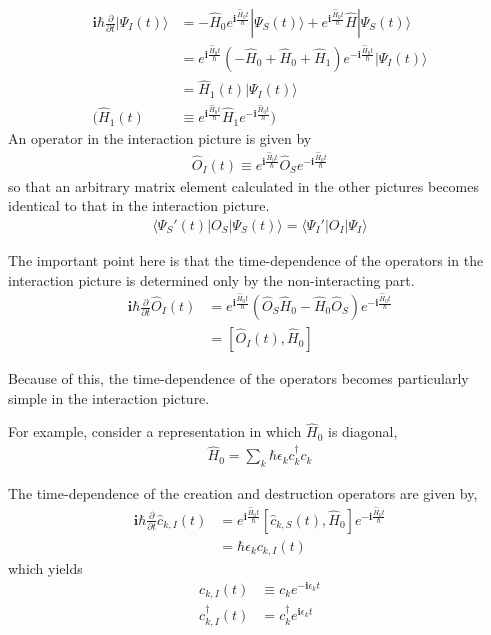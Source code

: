\begin{align}
\bm{i} \hbar \frac{\partial}{\partial t} |\Psi_I(t)\rangle & =  -\hat H_0 e^{\bm{i}  \frac{\hat H_0t}{\hbar}}|\Psi_S(t)\rangle+e^{\bm{i}  \frac{\hat H_0t}{\hbar}}\hat H|\Psi_S(t)\rangle \nonumber \\
& =  e^{\bm{i}  \frac{\hat H_0t}{\hbar}}(-\hat H_0+\hat H_0+\hat H_1)e^{-\bm{i}  \frac{\hat H_0t}{\hbar}} |\Psi_I(t)\rangle \nonumber \\
& =  \hat H_1(t)|\Psi_I(t)\rangle  \\
(\hat H_1(t) &  \equiv e^{\bm{i}  \frac{\hat H_0t}{\hbar}}\hat H_1 e^{-\bm{i}  \frac{\hat H_0t}{\hbar}}  ) \nonumber
\end{align}
 An operator in the interaction picture is given by 
\begin{align}\label{2-1-5}
\hat O_I(t) \equiv e^{\bm{i}  \frac{\hat H_0t}{\hbar}}\hat O_S e^{-\bm{i}  \frac{\hat H_0t}{\hbar}}
\end{align}
so that an arbitrary matrix element calculated in the other pictures becomes identical to that in the interaction picture.
\begin{align}
\langle\Psi_S'(t)|O_S|\Psi_S(t)\rangle=\langle\Psi_I'|O_I|\Psi_I\rangle \nonumber
\end{align}

 The important point here is that the time-dependence of the operators in
the interaction picture is determined only by the non-interacting part.
\begin{align}
\bm{i} \hbar \frac{\partial}{\partial t} \hat O_I(t) &= e^{\bm{i}  \frac{\hat H_0t}{\hbar}}(\hat O_S \hat H_0 - \hat H_0\hat O_S) e^{-\bm{i}  \frac{\hat H_0t}{\hbar}} \nonumber \\
&=[\hat O_I(t), \hat H_0] \nonumber
\end{align}

 Because of this, the time-dependence of the operators becomes particularly simple in the interaction picture.

 For example, consider a representation in which $\hat H_0$ is diagonal,
\begin{align}
\hat H_0= \sum_k \hbar \epsilon_k c_k^{\dagger} c_k \nonumber
\end{align}

 The time-dependence of the creation and destruction operators are given by,
\begin{align}
\bm{i} \hbar \frac{\partial}{\partial t} \hat c_{k,I}(t) &= e^{\bm{i}  \frac{\hat H_0t}{\hbar}}[\hat c_{k,S}(t), \hat H_0] e^{-\bm{i}  \frac{\hat H_0t}{\hbar}} \nonumber \\
&=\hbar \epsilon_k c_{k,I}(t) \nonumber
\end{align}
which yields
\begin{align}
c_{k,I}(t)&\equiv c_k e^{-\bm{i}\epsilon_kt} \nonumber \\
c_{k,I}^{\dagger}(t)&= c^{\dagger}_k e^{\bm{i}\epsilon_kt} \nonumber
\end{align}

